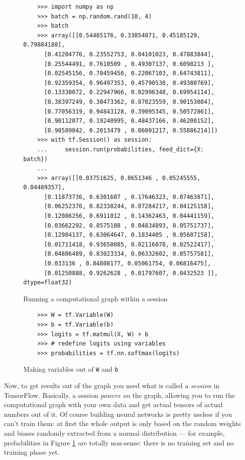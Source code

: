\begin{figure}
  \begin{verbatim}
    >>> import numpy as np
    >>> batch = np.random.rand(10, 4)
    >>> batch
    >>> array([[0.54485176, 0.33854871, 0.45185129, 0.79884188],
      [0.41204776, 0.23552753, 0.04101023, 0.47883844],
      [0.25544491, 0.7610509 , 0.49307137, 0.6098213 ],
      [0.02545156, 0.70459456, 0.22067103, 0.64743811],
      [0.92359354, 0.96497353, 0.45790538, 0.49380769],
      [0.13330072, 0.22947966, 0.02996348, 0.69954114],
      [0.38397249, 0.30473362, 0.87023559, 0.90153084],
      [0.77056319, 0.94843128, 0.39095345, 0.50572861],
      [0.90112077, 0.19240995, 0.48437166, 0.46200152],
      [0.98589042, 0.2013479 , 0.86091217, 0.55886214]])
    >>> with tf.Session() as session:
    ...     session.run(probabilities, feed_dict={X: batch})
    ...
    >>> array([[0.03751625, 0.8651346 , 0.05245555, 0.04489357],
      [0.11873736, 0.6301607 , 0.17646323, 0.07463871],
      [0.06252376, 0.82338244, 0.07284217, 0.04125158],
      [0.12086256, 0.6911012 , 0.14362463, 0.04441159],
      [0.03662292, 0.8575108 , 0.04834893, 0.05751737],
      [0.12984137, 0.63064647, 0.1834405 , 0.05607158],
      [0.01711418, 0.93650085, 0.02116078, 0.02522417],
      [0.04886489, 0.83023334, 0.06332602, 0.05757581],
      [0.033136 , 0.84808177, 0.05061754, 0.06816475],
      [0.01250888, 0.9262628 , 0.01797607, 0.0432523 ]], dtype=float32)
  \end{verbatim}
  \caption{Running a computational graph within a session}
  \label{fig:use-session}
\end{figure}

\begin{figure}
  \begin{verbatim}
    >>> W = tf.Variable(W)
    >>> b = tf.Variable(b)
    >>> logits = tf.matmul(X, W) + b
    >>> # redefine logits using variables 
    >>> probabilities = tf.nn.softmax(logits)
  \end{verbatim}
  \caption{Making variables out of \texttt{W} and \texttt{b}}
  \label{fig:making-variables}
\end{figure}

Now, to get results out of the graph you need what is called a
\emph{session} in TensorFlow. Basically, a session \emph{powers on} the
graph, allowing you to run the computational graph with your own data
and get actual tensors of actual numbers out of it. Of course building
neural networks is pretty useless if you can't train them: at first the
whole output is only based on the random weights and biases randomly
extracted from a normal distribution --- for example, probabilities in
Figure \ref{fig:use-session} are totally non-sense: there is no training
set and no training phase yet.

